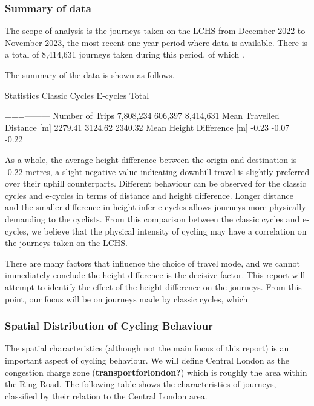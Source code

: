 \documentclass[
  letterpaper,
  DIV=11,
  numbers=noendperiod]{scrartcl}
\begin{document}
\hypertarget{summary-of-data}{%
\subsubsection{Summary of data}\label{summary-of-data}}

The scope of analysis is the journeys taken on the LCHS from December
2022 to November 2023, the most recent one-year period where data is
available. There is a total of 8,414,631 journeys taken during this
period, of which .

The summary of the data is shown as follows.

Statistics \textbar{} Classic Cycles \textbar{} E-cycles \textbar{}
Total \textbar{}

\textbar===\textbar---\textbar---\textbar---\textbar{} \textbar{} Number
of Trips \textbar{} 7,808,234 \textbar{} 606,397 \textbar{} 8,414,631
\textbar{} \textbar{} Mean Travelled Distance {[}m{]} \textbar{} 2279.41
\textbar{} 3124.62 \textbar{} 2340.32 \textbar{} \textbar{} Mean Height
Difference {[}m{]} \textbar{} -0.23 \textbar{} -0.07 \textbar{} -0.22
\textbar{}

As a whole, the average height difference between the origin and
destination is -0.22 metres, a slight negative value indicating downhill
travel is slightly preferred over their uphill counterparts. Different
behaviour can be observed for the classic cycles and e-cycles in terms
of distance and height difference. Longer distance and the smaller
difference in height infer e-cycles allows journeys more physically
demanding to the cyclists. From this comparison between the classic
cycles and e-cycles, we believe that the physical intensity of cycling
may have a correlation on the journeys taken on the LCHS.

There are many factors that influence the choice of travel mode, and we
cannot immediately conclude the height difference is the decisive
factor. This report will attempt to identify the effect of the height
difference on the journeys. From this point, our focus will be on
journeys made by classic cycles, which

\hypertarget{spatial-distribution-of-cycling-behaviour}{%
\subsubsection{Spatial Distribution of Cycling
Behaviour}\label{spatial-distribution-of-cycling-behaviour}}

The spatial characteristics (although not the main focus of this report)
is an important aspect of cycling behaviour. We will define Central
London as the congestion charge zone (\textbf{transportforlondon?})
which is roughly the area within the Ring Road. The following table
shows the characteristics of journeys, classified by their relation to
the Central London area.
\end{document}
